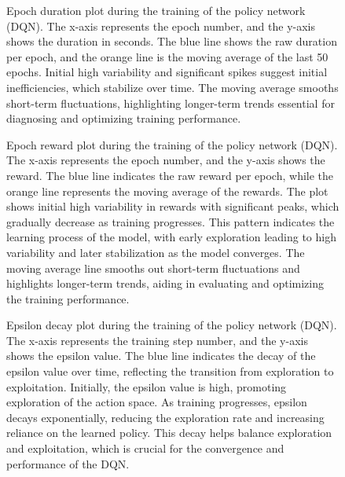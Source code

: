 \begin{figure}[!h]
\centering

\caption{Epoch duration plot during the training of the policy network (DQN). The x-axis represents the epoch number, and the y-axis shows the duration in seconds. The blue line shows the raw duration per epoch, and the orange line is the moving average of the last 50 epochs. Initial high variability and significant spikes suggest initial inefficiencies, which stabilize over time. The moving average smooths short-term fluctuations, highlighting longer-term trends essential for diagnosing and optimizing training performance.}


\label{fig: episode_duration}
\end{figure}

\begin{figure}[!h]
\centering
\centerline{}
\caption{Epoch reward plot during the training of the policy network (DQN). The x-axis represents the epoch number, and the y-axis shows the reward. The blue line indicates the raw reward per epoch, while the orange line represents the moving average of the rewards. The plot shows initial high variability in rewards with significant peaks, which gradually decrease as training progresses. This pattern indicates the learning process of the model, with early exploration leading to high variability and later stabilization as the model converges. The moving average line smooths out short-term fluctuations and highlights longer-term trends, aiding in evaluating and optimizing the training performance.}
\label{fig: episode_reward}
\end{figure}

\begin{figure}[!h]
\centering
\centerline{}
\caption{Epsilon decay plot during the training of the policy network (DQN). The x-axis represents the training step number, and the y-axis shows the epsilon value. The blue line indicates the decay of the epsilon value over time, reflecting the transition from exploration to exploitation. Initially, the epsilon value is high, promoting exploration of the action space. As training progresses, epsilon decays exponentially, reducing the exploration rate and increasing reliance on the learned policy. This decay helps balance exploration and exploitation, which is crucial for the convergence and performance of the DQN.}
\label{fig: epsilon_decay}
\end{figure}

